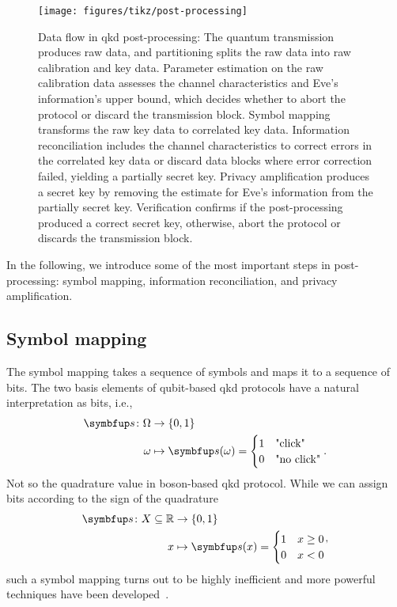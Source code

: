 \begin{figure}[htb]
	\centering
	\texttt{[image: figures/tikz/post-processing]}
	\caption{Data flow in \gls{qkd} post-processing: The quantum transmission produces raw data, and partitioning splits the raw data into raw calibration and key data. Parameter estimation on the raw calibration data assesses the channel characteristics and Eve's information's upper bound, which decides whether to abort the protocol or discard the transmission block. Symbol mapping transforms the raw key data to correlated key data. Information reconciliation includes the channel characteristics to correct errors in the correlated key data or discard data blocks where error correction failed, yielding a partially secret key. Privacy amplification produces a secret key by removing the estimate for Eve's information from the partially secret key. Verification confirms if the post-processing produced a correct secret key, otherwise, abort the protocol or discards the transmission block.}\label{fig:post_processing}
\end{figure}
In the following, we introduce some of the most important steps in post-processing: symbol mapping, information reconciliation, and privacy amplification.

\FloatBarrier
\subsection{Symbol mapping}

The symbol mapping takes a sequence of symbols and maps it to a sequence of bits.
The two basis elements of qubit-based \gls{qkd} protocols have a natural interpretation as bits, i.e.,
\begin{equation}
	\begin{split}
		\vb{s}\colon\Omega&\to\{0,1\} \\
		\omega &\mapsto \vb{s}(\omega)
		=
		\begin{cases}
			1 & \text{"click"} \\
			0 & \text{"no click"}
		\end{cases}
		.
	\end{split}
\end{equation}
Not so the quadrature value in boson-based \gls{qkd} protocol.
While we can assign bits according to the sign of the quadrature
\begin{equation}
	\begin{split}
		\vb{s}\colon X\subseteq\mathbb{R}&\to\{0,1\} \\
		x &\mapsto \vb{s}(x)
		=
		\begin{cases}
			1 & x\geq0 \\
			0 & x<0
		\end{cases}
	\end{split}
	,
\end{equation}
such a symbol mapping turns out to be highly inefficient and more powerful techniques have been developed~\cite{VanAsche2004,Leverrier2008}.

